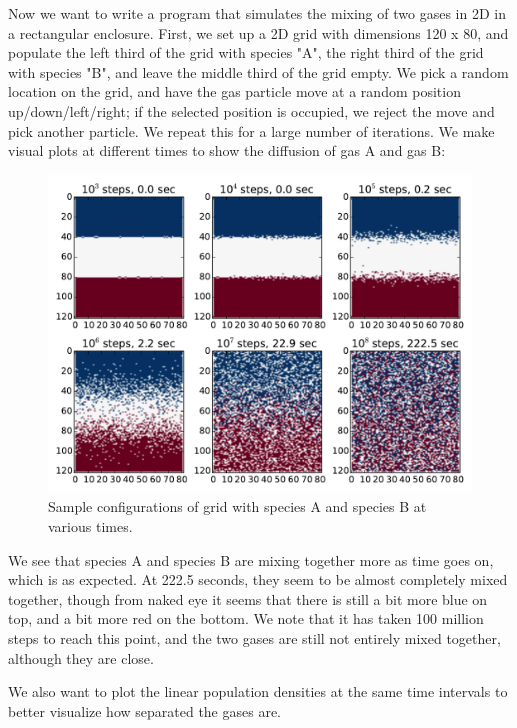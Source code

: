 \documentclass{article}
\begin{document}
\smallskip
Now we want to write a program that simulates the mixing of two gases in 2D in a rectangular enclosure. First, we set up a 2D grid with dimensions 120 x 80, and populate the left third of the grid with species "A", the right third of the grid with species "B", and leave the middle third of the grid empty. We pick a random location on the grid, and have the gas particle move at a random position up/down/left/right; if the selected position is occupied, we reject the move and pick another particle. We repeat this for a large number of iterations. We make visual plots at different times to show the diffusion of gas A and gas B:\par
\begin{figure}[H]
\centering
\includegraphics[width=12cm]{GP1_3b_1.pdf}
\caption{Sample configurations of grid with species A and species B at various times.}
\label{fig:grid}
\end{figure}
\noindent We see that species A and species B are mixing together more as time goes on, which is as expected. At 222.5 seconds, they seem to be almost completely mixed together, though from naked eye it seems that there is still a bit more blue on top, and a bit more red on the bottom. We note that it has taken 100 million steps to reach this point, and the two gases are still not entirely mixed together, although they are close.\par
We also want to plot the linear population densities at the same time intervals to better visualize how separated the gases are.\par
\end{document}
